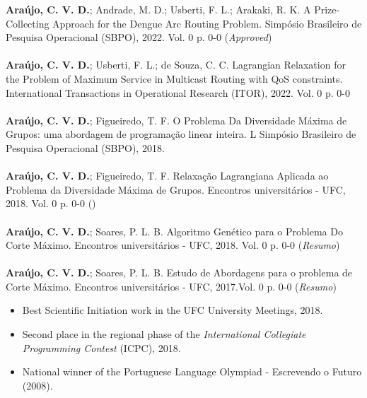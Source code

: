 \documentclass[10pt,a4paper,ragged2e,withhyper]{altacv}
\begin{document}
\begin{paracol}{1}
        \medskip
        \textbf{Araújo, C. V. D.}; Andrade, M. D.; Usberti, F. L.; Arakaki, R. K.
        \textcolor{SecondaryColor}{A Prize-Collecting Approach for the Dengue
          Arc Routing Problem}. Simpósio Brasileiro de Pesquisa Operacional
        (SBPO), 2022. Vol. 0 p. 0-0 (\emph{Approved}) \\
        \divider \\ 
        \textbf{Araújo, C. V. D.}; Usberti, F. L.; de Souza, C. C.
        \textcolor{SecondaryColor}{Lagrangian Relaxation for the Problem of Maximum Service in Multicast Routing with QoS constraints}. International Transactions in Operational Research (ITOR), 2022. Vol. 0 p. 0-0 \\
        \divider \\
        \textbf{Araújo, C. V. D.}; Figueiredo, T. F.
        \textcolor{SecondaryColor}{O Problema Da Diversidade Máxima de Grupos: uma abordagem de programação linear inteira}.  L Simpósio Brasileiro de Pesquisa Operacional (SBPO), 2018. \\
    		\divider \\
    		\textbf{Araújo, C. V. D.}; Figueiredo, T. F.
    		\textcolor{SecondaryColor}{Relaxação Lagrangiana Aplicada ao Problema da Diversidade Máxima de Grupos}. Encontros universitários - UFC, 2018. Vol. 0 p. 0-0 (\emph{}) \\
    		\divider \\
    		\textbf{Araújo, C. V. D.}; Soares, P. L. B. 
    		\textcolor{SecondaryColor}{Algoritmo Genético para o Problema Do Corte Máximo}. Encontros universitários - UFC, 2018. Vol. 0 p. 0-0 (\emph{Resumo}) \\
            \divider \\
            \textbf{Araújo, C. V. D.}; Soares, P. L. B.
            \textcolor{SecondaryColor}{Estudo de Abordagens para o problema de Corte Máximo}. Encontros universitários  - UFC, 2017.Vol. 0 p. 0-0 (\emph{Resumo}) \\
	    \medskip
        \begin{itemize}
            \item Best Scientific Initiation work in the
              \textcolor{SecondaryColor}{UFC University Meetings, 2018}.
            \item Second place in the regional phase of the \textcolor{SecondaryColor}{\textit{International Collegiate Programming Contest} (ICPC), 2018}.
            \item National winner of the \textcolor{SecondaryColor}{Portuguese
                Language Olympiad - Escrevendo o Futuro (2008)}.     
        \end{itemize}
    \end{paracol}
\end{document}
